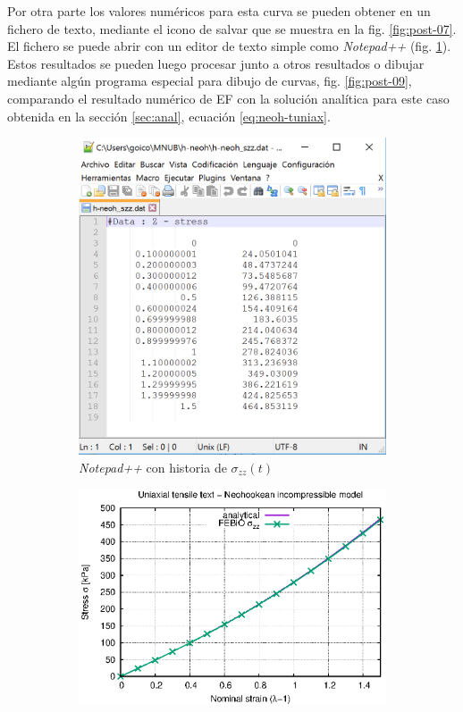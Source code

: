 Por otra parte los valores numéricos para esta curva se pueden obtener en un fichero de texto, mediante el icono de salvar que se muestra en la fig. \ref{fig:post-07}.
El fichero se puede abrir con un editor de texto simple como \emph{Notepad++} (fig. \ref{fig:post-08}).
Estos resultados se pueden luego procesar junto a otros resultados o dibujar mediante algún programa especial para dibujo de curvas, fig. \ref{fig:post-09}, comparando el resultado numérico de EF con la solución analítica para este caso obtenida en la sección \ref{sec:anal}, ecuación \eqref{eq:neoh-tuniax}.
\begin{figure}[!htbp]
\centering
\begin{subfigure}[b]{0.41\textwidth}
\centering
\includegraphics[width=\textwidth]{figuras_3/notepad-szz.png}
\caption{\emph{Notepad++} con historia de $\sigma_{zz}(t)$}
\label{fig:post-08}
\end{subfigure}
\begin{subfigure}[b]{0.56\textwidth}
\centering
\includegraphics[width=\textwidth]{figuras_3/hneoh_feb.eps}

\end{subfigure}
\end{figure}
